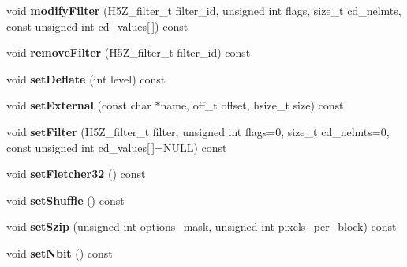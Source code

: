 \begin{DoxyCompactItemize}
void {\bfseries modify\+Filter} (H5\+Z\+\_\+filter\+\_\+t filter\+\_\+id, unsigned int flags, size\+\_\+t cd\+\_\+nelmts, const unsigned int cd\+\_\+values\mbox{[}$\,$\mbox{]}) const
\item 
\mbox{\label{class_h5_1_1_d_set_creat_prop_list_a19d9c77e3a708f4d47f2f4014226f7d0}} 
void {\bfseries remove\+Filter} (H5\+Z\+\_\+filter\+\_\+t filter\+\_\+id) const
\item 
\mbox{\label{class_h5_1_1_d_set_creat_prop_list_a37a511688501ada6f5d704faad55c35d}} 
void {\bfseries set\+Deflate} (int level) const
\item 
\mbox{\label{class_h5_1_1_d_set_creat_prop_list_a9b382a5d14948c1e91f5d5c88e4eca3d}} 
void {\bfseries set\+External} (const char $\ast$name, off\+\_\+t offset, hsize\+\_\+t size) const
\item 
\mbox{\label{class_h5_1_1_d_set_creat_prop_list_a247215c1a524506e675e7f4ad92b9f5f}} 
void {\bfseries set\+Filter} (H5\+Z\+\_\+filter\+\_\+t filter, unsigned int flags=0, size\+\_\+t cd\+\_\+nelmts=0, const unsigned int cd\+\_\+values\mbox{[}$\,$\mbox{]}=N\+U\+LL) const
\item 
\mbox{\label{class_h5_1_1_d_set_creat_prop_list_a020f96fa3b037cb8b05f069a3ae6a9a8}} 
void {\bfseries set\+Fletcher32} () const
\item 
\mbox{\label{class_h5_1_1_d_set_creat_prop_list_a52be06f37b6470b4cf429651e8138642}} 
void {\bfseries set\+Shuffle} () const
\item 
\mbox{\label{class_h5_1_1_d_set_creat_prop_list_a265a52949f8486027cee3113df9459c9}} 
void {\bfseries set\+Szip} (unsigned int options\+\_\+mask, unsigned int pixels\+\_\+per\+\_\+block) const
\item 
\mbox{\label{class_h5_1_1_d_set_creat_prop_list_a0f1882fa81bac7edaae5d771d6c5029e}} 
void {\bfseries set\+Nbit} () const
\item 
\mbox{\label{class_h5_1_1_d_set_creat_prop_list_a595c7bcad3a21708013a825e465d8284}} 

\end{DoxyCompactItemize}
